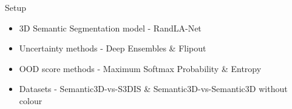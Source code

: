 \documentclass[aspectratio=169]{beamer}
\begin{document}
\begin{frame}[noframenumbering]{Setup}
    \begin{itemize}
        \item 3D Semantic Segmentation model - RandLA-Net
        \item Uncertainty methods - Deep Ensembles \& Flipout
        \item OOD score methods - Maximum Softmax Probability \& Entropy
        \item Datasets - Semantic3D-vs-S3DIS \& Semantic3D-vs-Semantic3D without colour
    \end{itemize}
\end{frame}
\end{document}
